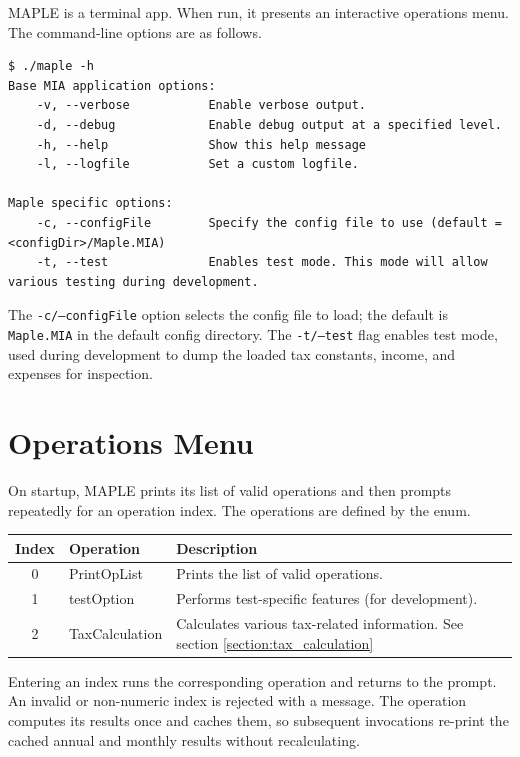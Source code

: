 MAPLE is a terminal app. When run, it presents an interactive operations menu. The command-line options are as follows.

\begin{lstlisting}[style=terminalstyle]
$ ./maple -h
Base MIA application options:
	-v, --verbose           Enable verbose output.
	-d, --debug             Enable debug output at a specified level.
	-h, --help              Show this help message
	-l, --logfile           Set a custom logfile.

Maple specific options:
	-c, --configFile        Specify the config file to use (default = <configDir>/Maple.MIA)
	-t, --test              Enables test mode. This mode will allow various testing during development.
\end{lstlisting}

The \texttt{-c/--configFile} option selects the config file to load; the default is \texttt{Maple.MIA} in the default config directory. The \texttt{-t/--test} flag enables test mode, used during development to dump the loaded tax constants, income, and expenses for inspection.

\section{Operations Menu}

On startup, MAPLE prints its list of valid operations and then prompts repeatedly for an operation index. The operations are defined by the  enum.

\begin{table}[h]
	\centering
	\label{table:maple_operations}
	\begin{tabularx}{\textwidth}{|c|l|X|}
		\hline
		\textbf{Index} & \textbf{Operation} & \textbf{Description} \\
		\hline
		0 & PrintOpList & Prints the list of valid operations. \\
		\hline
		1 & testOption & Performs test-specific features (for development). \\
		\hline
		2 & TaxCalculation & Calculates various tax-related information. See section \ref{section:tax_calculation}\\
		\hline
	\end{tabularx}
\end{table}

Entering an index runs the corresponding operation and returns to the prompt. An invalid or non-numeric index is rejected with a message. The  operation computes its results once and caches them, so subsequent invocations re-print the cached annual and monthly results without recalculating.

